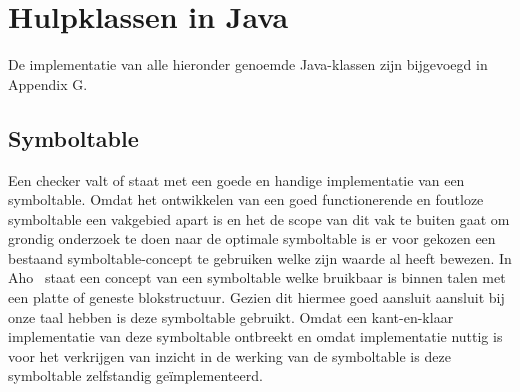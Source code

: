 \chapter{Hulpklassen in Java}
De implementatie van alle hieronder genoemde Java-klassen zijn bijgevoegd in Appendix G.
\section{Symboltable}
Een checker valt of staat met een goede en handige implementatie van een symboltable. Omdat het ontwikkelen van een goed functionerende en foutloze symboltable een vakgebied apart is en het de scope van dit vak te buiten gaat om grondig onderzoek te doen naar de optimale symboltable is er voor gekozen een bestaand symboltable-concept te gebruiken welke zijn waarde al heeft bewezen. In Aho~\cite[p.85-90]{aho2007compilers} staat een concept van een symboltable welke bruikbaar is binnen talen met een platte of geneste blokstructuur. Gezien dit hiermee goed aansluit aansluit bij onze taal hebben is deze symboltable gebruikt. Omdat een kant-en-klaar implementatie van deze symboltable ontbreekt en omdat implementatie nuttig is voor het verkrijgen van inzicht in de werking van de symboltable is deze symboltable zelfstandig ge\"{i}mplementeerd. 
